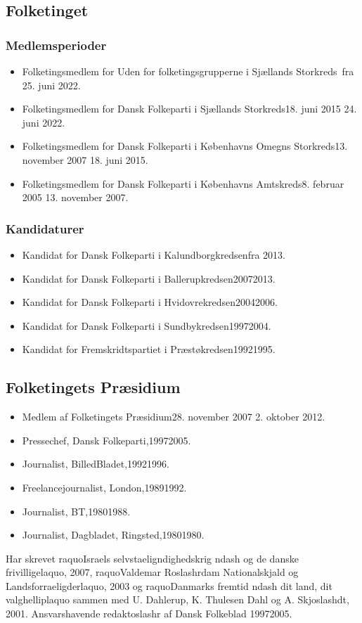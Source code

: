\documentclass[11pt, a4paper]{awesome-cv}
\begin{document}
\begin{cvletter}
\subsection*{Folketinget}
\subsubsection*{Medlemsperioder}
\begin{itemize}
\item Folketingsmedlem for Uden for folketingsgrupperne i Sjællands Storkreds fra 25. juni 2022.
\item Folketingsmedlem for Dansk Folkeparti i Sjællands Storkreds18. juni 2015  24. juni 2022.
\item Folketingsmedlem for Dansk Folkeparti i Københavns Omegns Storkreds13. november 2007  18. juni 2015.
\item Folketingsmedlem for Dansk Folkeparti i Københavns Amtskreds8. februar 2005  13. november 2007.
\end{itemize}
\subsubsection*{Kandidaturer}
\begin{itemize}
\item Kandidat for Dansk Folkeparti i Kalundborgkredsenfra 2013.
\item Kandidat for Dansk Folkeparti i Ballerupkredsen20072013.
\item Kandidat for Dansk Folkeparti i Hvidovrekredsen20042006.
\item Kandidat for Dansk Folkeparti i Sundbykredsen19972004.
\item Kandidat for Fremskridtspartiet i Præstøkredsen19921995.
\end{itemize}
\subsection*{Folketingets Præsidium}
\begin{itemize}
\item Medlem af Folketingets Præsidium28. november 2007  2. oktober 2012.
\end{itemize}
\begin{itemize}
\item Pressechef, Dansk Folkeparti,19972005.
\item Journalist, BilledBladet,19921996.
\item Freelancejournalist, London,19891992.
\item Journalist, BT,19801988.
\item Journalist, Dagbladet, Ringsted,19801980.
\end{itemize}
Har skrevet raquoIsraels selvstaeligndighedskrig ndash og de danske frivilligelaquo, 2007, raquoValdemar Roslashrdam  Nationalskjald og Landsforraeligderlaquo, 2003 og raquoDanmarks fremtid ndash dit land, dit valghelliplaquo sammen med U. Dahlerup, K. Thulesen Dahl og A. Skjoslashdt, 2001.  Ansvarshavende redaktoslashr af Dansk Folkeblad 19972005.

\end{cvletter}
\end{document}
